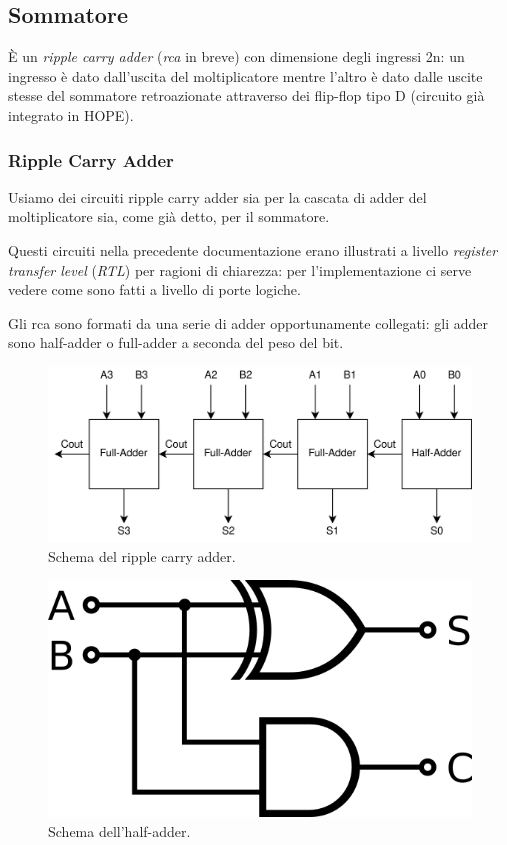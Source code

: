 \documentclass[12pt, letterpaper]{article}
\begin{document}
\subsection{Sommatore}
È un \textit{ripple carry adder} (\textit{rca} in breve) con dimensione degli ingressi 2n: un ingresso è dato dall'uscita del moltiplicatore mentre l'altro è dato dalle uscite stesse del sommatore retroazionate attraverso dei flip-flop tipo D (circuito già integrato in HOPE).

\subsubsection{Ripple Carry Adder}

Usiamo dei circuiti ripple carry adder sia per la cascata di adder del moltiplicatore sia, come già detto, per il sommatore.

Questi circuiti nella precedente documentazione erano illustrati a livello \textit{register transfer level} (\textit{RTL}) per ragioni di chiarezza: per l'implementazione ci serve vedere come sono fatti a livello di porte logiche.

Gli rca sono formati da una serie di adder opportunamente collegati: gli adder sono half-adder o full-adder a seconda del peso del bit.

\begin{figure}
\centering
\includegraphics[width=\textwidth]{ripple_carry_adder}
\caption{Schema del ripple carry adder.}
\label{rca}
\end{figure}

\begin{figure}
\centering
\includegraphics{half_adder}
\caption{Schema dell'half-adder.}
\end{figure}
\end{document}
